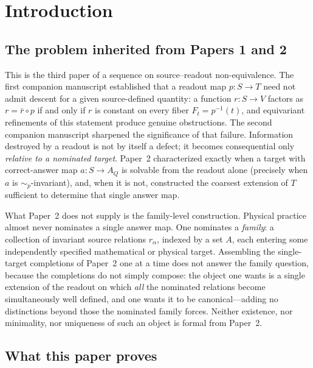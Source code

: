 \documentclass[11pt,reqno]{amsart}
\theoremstyle{plain}
\theoremstyle{definition}
\theoremstyle{remark}
\numberwithin{equation}{section}
\begin{document}
\maketitle

\section{Introduction}
\label{sec:intro}

\subsection{The problem inherited from Papers 1 and 2}

This is the third paper of a sequence on source--readout non-equivalence. The first companion
manuscript \cite{Paper1} established that a readout map $p\colon S\to T$ need not admit descent for
a given source-defined quantity: a function $r\colon S\to V$ factors as $r=\bar r\circ p$ if and
only if $r$ is constant on every fiber $F_t=p^{-1}(t)$, and equivariant refinements of this
statement produce genuine obstructions. The second companion manuscript \cite{Paper2} sharpened the
significance of that failure. Information destroyed by a readout is not by itself a defect; it
becomes consequential only \emph{relative to a nominated target}. Paper~2 characterized exactly
when a target with correct-answer map $a\colon S\to A_Q$ is solvable from the readout alone
(precisely when $a$ is $\sim_p$-invariant), and, when it is not, constructed the coarsest extension
of $T$ sufficient to determine that single answer map.

What Paper~2 does not supply is the family-level construction. Physical practice almost never
nominates a single answer map. One nominates a \emph{family}: a collection of invariant source
relations $r_\alpha$, indexed by a set $A$, each entering some independently specified mathematical
or physical target. Assembling the single-target completions of Paper~2 one at a time does not
answer the family question, because the completions do not simply compose: the object one wants is
a single extension of the readout on which \emph{all} the nominated relations become simultaneously
well defined, and one wants it to be canonical---adding no distinctions beyond those the nominated
family forces. Neither existence, nor minimality, nor uniqueness of such an object is formal from
Paper~2.

\subsection{What this paper proves}
\end{document}
